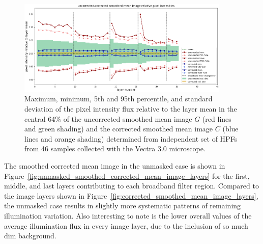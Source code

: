 \documentclass[letterpaper,11pt]{article}
\newcommand{\reffig}[1]{Figure~\ref{#1}}
\begin{document}
\begin{figure}[!ht]
\centering
\includegraphics[width=0.90\textwidth]{images/results/unmasked_flatfield_illumination_variation_reduction}
\caption{\footnotesize Maximum, minimum, 5th and 95th percentile, and standard deviation of the pixel intensity flux relative to the layer mean in the central 64\% of the uncorrected smoothed mean image $G$ (red lines and green shading) and the corrected smoothed mean image $C$ (blue lines and orange shading) determined from independent set of HPFs from 46 samples collected with the Vectra 3.0 microscope.}
\label{fig:unmasked_illumination_variation_reduction}
\end{figure} 

The smoothed corrected mean image in the unmasked case is shown in \reffig{fig:unmasked_smoothed_corrected_mean_image_layers} for the first, middle, and last layers contributing to each broadband filter region. Compared to the image layers shown in \reffig{fig:corrected_smoothed_mean_image_layers}, the unmasked case results in slightly more systematic patterns of remaining illumination variation. Also interesting to note is the lower overall values of the average illumination flux in every image layer, due to the inclusion of so much dim background.
\end{document}
